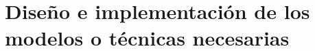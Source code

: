 \chapter{Diseño e implementación de los modelos o técnicas necesarias}\label{ch: modelDesign}
\lipsum[20-25]
\lipsum[20-25]